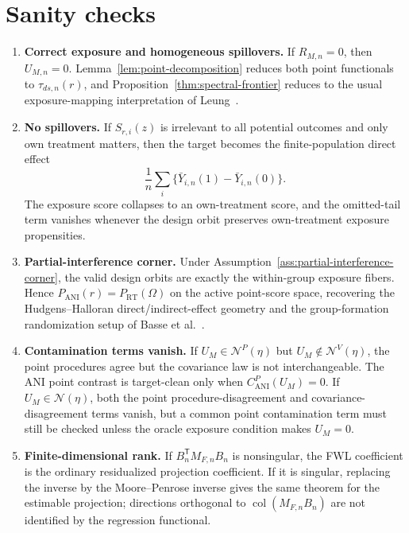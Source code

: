 \documentclass[11pt]{article}
\newcommand{\transpose}{\mathsf{T}}
\theoremstyle{definition}
\theoremstyle{plain}
\theoremstyle{remark}
\begin{document}
\section{Sanity checks}
\begin{enumerate}[leftmargin=*]
\item \textbf{Correct exposure and homogeneous spillovers.}  If
\(R_{M,n}=0\), then \(U_{M,n}=0\).  Lemma~\ref{lem:point-decomposition}
reduces both point functionals to \(\tau_{ds,n}(r)\), and
Proposition~\ref{thm:spectral-frontier} reduces to the usual exposure-mapping
interpretation of Leung~\cite{Leung2022ANI}.

\item \textbf{No spillovers.}  If \(S_{r,i}(z)\) is irrelevant to all
potential outcomes and only own treatment matters, then the target becomes the
finite-population direct effect
\[
  \frac1n\sum_i\{\bar Y_{i,n}(1)-\bar Y_{i,n}(0)\}.
\]
The exposure score collapses to an own-treatment score, and the omitted-tail
term vanishes whenever the design orbit preserves own-treatment exposure
propensities.

\item \textbf{Partial-interference corner.}  Under
Assumption~\ref{ass:partial-interference-corner}, the valid design orbits are
exactly the within-group exposure fibers.  Hence
\(P_{\mathrm{ANI}}(r)=P_{\mathrm{RT}}(\Omega)\) on the active point-score
space, recovering the Hudgens--Halloran direct/indirect-effect geometry and
the group-formation randomization setup of Basse et al.~\cite{BasseDingFellerToulis2024}.

\item \textbf{Contamination terms vanish.}  If
\(U_M\in\mathcal N^P(\eta)\) but \(U_M\notin\mathcal N^V(\eta)\), the point
procedures agree but the covariance law is not interchangeable.  The ANI
point contrast is target-clean only when
\(C^P_{\mathrm{ANI}}(U_M)=0\).  If \(U_M\in\mathcal N(\eta)\), both the point
procedure-disagreement and covariance-disagreement terms vanish, but a common
point contamination term must still be checked unless the oracle exposure
condition makes \(U_M=0\).

\item \textbf{Finite-dimensional rank.}  If \(B_n^{\transpose}M_{F,n}B_n\)
is nonsingular, the FWL coefficient is the ordinary residualized projection
coefficient.  If it is singular, replacing the inverse by the Moore--Penrose
inverse gives the same theorem for the estimable projection; directions
orthogonal to \(\operatorname{col}(M_{F,n}B_n)\) are not identified by the
regression functional.
\end{enumerate}
\end{document}
